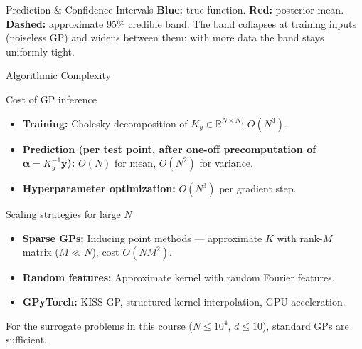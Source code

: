\documentclass[aspectratio=169,11pt]{beamer}
\newcommand{\emphc}[1]{\textcolor{harvardcrimson}{#1}}
\newcommand{\R}{\mathbb{R}}
\begin{document}
\begin{frame}[shrink=5]{Prediction \& Confidence Intervals}
\vspace{0.05cm}
{\footnotesize \textcolor{uzhblue}{\textbf{Blue:}} true function. \textcolor{harvardcrimson}{\textbf{Red:}} posterior mean. \textcolor{harvardcrimson}{\textbf{Dashed:}} approximate 95\% credible band. The band collapses at training inputs (noiseless GP) and widens between them; with more data the band stays uniformly tight.}
\end{frame}

\begin{frame}[shrink=5]{Algorithmic Complexity}
\begin{block}{Cost of GP inference}
\begin{itemize}
  \item \textbf{Training:} Cholesky decomposition of $K_y \in \R^{N \times N}$: \emphc{$O(N^3)$}.
  \item \textbf{Prediction (per test point, after one-off precomputation of $\bm\alpha = K_y^{-1}\bm y$):} $O(N)$ for mean, $O(N^2)$ for variance.
  \item \textbf{Hyperparameter optimization:} $O(N^3)$ per gradient step.
\end{itemize}
\end{block}

\vspace{0.15cm}
\begin{block}{Scaling strategies for large $N$}
\begin{itemize}
  \item \textbf{Sparse GPs:} Inducing point methods --- approximate $K$ with rank-$M$ matrix ($M \ll N$), cost $O(NM^2)$.
  \item \textbf{Random features:} Approximate kernel with random Fourier features.
  \item \textbf{GPyTorch:} KISS-GP, structured kernel interpolation, GPU acceleration.
\end{itemize}
\end{block}

\vspace{0.1cm}
{\footnotesize For the surrogate problems in this course ($N \leq 10^4$, $d \leq 10$), standard GPs are sufficient.}
\end{frame}
\end{document}
